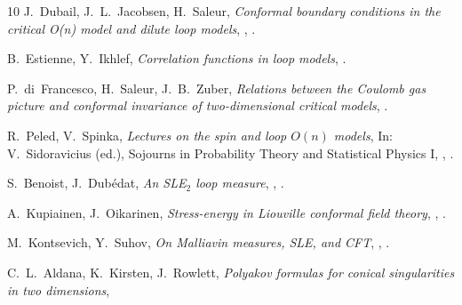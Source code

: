 \documentclass[11pt,a4paper]{article}
\numberwithin{equation}{section}
\begin{document}
\begin{thebibliography}{10}
J.~Dubail, J.~L.~Jacobsen, H.~Saleur,
\textit{Conformal boundary conditions in the critical O(n) model and dilute loop models},
,
.

B.~Estienne, Y.~Ikhlef,
\textit{Correlation functions in loop models},
.

P.~di~Francesco, H.~Saleur, J.~B.~Zuber,
\textit{Relations between the Coulomb gas picture and conformal invariance of two-dimensional critical models}, 
. 

R.~Peled, V.~Spinka,
\textit{Lectures on the spin and loop $O(n)$ models},
In: V.~Sidoravicius (ed.), Sojourns in Probability Theory and Statistical Physics I, , 
.

S.~Benoist, J.~Dub\'edat,
{\it An SLE${}_2$ loop measure},
,
.

A.~Kupiainen, J.~Oikarinen,
{\it Stress-energy in Liouville conformal field theory},
,
.

M.~Kontsevich, Y.~Suhov, 
{\it On Malliavin measures, SLE, and CFT},
,
.

C.~L.~Aldana, K.~Kirsten, J.~Rowlett,
{\it Polyakov formulas for conical singularities in two dimensions},

\end{thebibliography}
\end{document}

